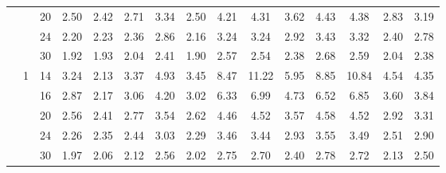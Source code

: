 \documentclass[num-refs]{wiley-article}
\begin{document}
\begin{table}
\begin{tabular}[t]{ccccccccccccccc}
& & 20 & 2.50 & 2.42 & 2.71 & 3.34 & 2.50 & 4.21 & 4.31 & 3.62 & 4.43 & 4.38 & 2.83 & 3.19\\
& & 24 & 2.20 & 2.23 & 2.36 & 2.86 & 2.16 & 3.24 & 3.24 & 2.92 & 3.43 & 3.32 & 2.40 & 2.78\\
& & 30 & 1.92 & 1.93 & 2.04 & 2.41 & 1.90 & 2.57 & 2.54 & 2.38 & 2.68 & 2.59 & 2.04 & 2.38\\
\hline
 & 1 & 14 & 3.24 & 2.13 & 3.37 & 4.93 & 3.45 & 8.47 & 11.22 & 5.95 & 8.85 & 10.84 & 4.54 & 4.35\\
& & 16 & 2.87 & 2.17 & 3.06 & 4.20 & 3.02 & 6.33 & 6.99 & 4.73 & 6.52 & 6.85 & 3.60 & 3.84\\
& & 20 & 2.56 & 2.41 & 2.77 & 3.54 & 2.62 & 4.46 & 4.52 & 3.57 & 4.58 & 4.52 & 2.92 & 3.31\\
& & 24 & 2.26 & 2.35 & 2.44 & 3.03 & 2.29 & 3.46 & 3.44 & 2.93 & 3.55 & 3.49 & 2.51 & 2.90\\
& & 30 & 1.97 & 2.06 & 2.12 & 2.56 & 2.02 & 2.75 & 2.70 & 2.40 & 2.78 & 2.72 & 2.13 & 2.50\\
\hline
\end{tabular}
\label{sce2:length}
\end{table}
\end{document}
